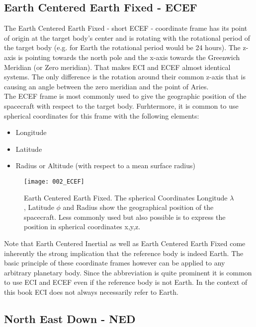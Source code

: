 \subsection{Earth Centered Earth Fixed - ECEF}
	The Earth Centered Earth Fixed - short ECEF - coordinate frame has its point of origin at the target body's center and is rotating with the rotational period of the target body (e.g. for Earth the rotational period would be 24 hours). The z-axis is pointing towards the north pole and the x-axis towards the Greenwich Meridian (or Zero meridian). That makes ECI and ECEF almost identical systems. The only difference is the rotation around their common z-axis that is causing an angle between the zero meridian and the point of Aries. \\
	The ECEF frame is most commonly used to give the geographic position of the spacecraft with respect to the target body. Furhtermore, it is common to use spherical coordinates for this frame with the following elements: 
		\begin{itemize}
			\item Longitude
			\item Latitude 
			\item Radius or Altitude (with respect to a mean surface radius)
		\end{itemize}

\begin{figure}[h!]	
	\texttt{[image: 002\_ECEF]}
	\caption[Earth Centered Earth Fixed]{Earth Centered Earth Fixed. The spherical Coordinates Longitude $\lambda$, Latitude $\phi$ and Radius show the geographical position of the spacecraft. Less commonly used but also possible is to express the position in spherical coordinates x,y,z. }
\end{figure}

\begin{kaobox}[frametitle=Reference Body]
	Note that Earth Centered Inertial as well as Earth Centered Earth Fixed come inherently the strong implication that the reference body is indeed Earth. The basic principle of these coordinate frames however can be applied to any arbitrary planetary body. Since the abbreviation is quite prominent it is common to use ECI and ECEF even if the reference body is not Earth. In the context of this book ECI does not always necessarily refer to Earth.
\end{kaobox}

\subsection{North East Down - NED}
